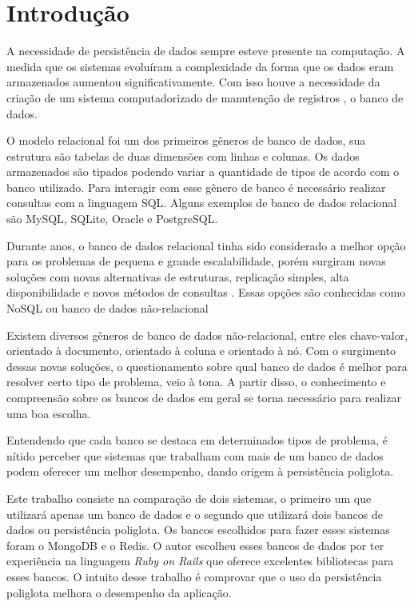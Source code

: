 \chapter{Introdução}\label{chap:introducao}
A necessidade de persistência de dados sempre esteve presente na computação. A medida que os sistemas evoluíram a complexidade da forma que os dados eram armazenados aumentou significativamente. Com isso houve a necessidade da criação de um sistema computadorizado de manutenção de registros \cite{CJDate}, o banco de dados.

O modelo relacional foi um dos primeiros gêneros de banco de dados, sua estrutura são tabelas de duas dimensões com linhas e colunas. Os dados armazenados são tipados podendo variar a quantidade de tipos de acordo com o banco utilizado. Para interagir com esse gênero de banco é necessário realizar consultas com a linguagem SQL. Alguns exemplos de banco de dados relacional são MySQL, SQLite, Oracle e PostgreSQL.

Durante anos, o banco de dados relacional tinha sido considerado a melhor opção para os problemas de pequena e grande escalabilidade, porém surgiram novas soluções com novas alternativas de estruturas, replicação simples, alta disponibilidade e novos métodos de consultas \cite{SDSW}. Essas opções são conhecidas como NoSQL ou banco de dados não-relacional

Existem diversos gêneros de banco de dados não-relacional, entre eles chave-valor, orientado à documento, orientado à coluna e orientado à nó. Com o surgimento dessas novas soluções, o questionamento sobre qual banco de dados é melhor para resolver certo tipo de problema, veio à tona. A partir disso, o conhecimento e compreensão sobre os bancos de dados em geral se torna necessário para realizar uma boa escolha.

Entendendo que cada banco se destaca em determinados tipos de problema, é nítido perceber que sistemas que trabalham com mais de um banco de dados podem oferecer um melhor desempenho, dando origem à persistência poliglota.

Este trabalho consiste na comparação de dois sistemas, o primeiro um que utilizará apenas um banco de dados e o segundo que utilizará dois bancos de dados ou persistência poliglota. Os bancos escolhidos para fazer esses sistemas foram o MongoDB e o Redis. O autor escolheu esses bancos de dados por ter experiência na linguagem \textit{Ruby on Rails} que oferece excelentes bibliotecas para esses bancos. O intuito desse trabalho é comprovar que o uso da persistência poliglota melhora o desempenho da aplicação.

